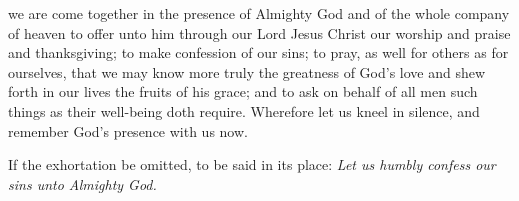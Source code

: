  we are come together in the presence of Almighty God and of the whole company of heaven to offer unto him through our Lord Jesus Christ our worship and praise and thanksgiving; to make confession of our sins; to pray, as well for others as for ourselves, that we may know more truly the greatness of God's love and shew forth in our lives the fruits of his grace; and to ask on behalf of all men such things as their well-being doth require. Wherefore let us kneel in silence, and remember God's presence with us now.

\begin{rubric}%
	If the exhortation be omitted, to be said in its place: \emph{Let us humbly confess our sins unto Almighty God.}
\end{rubric}

